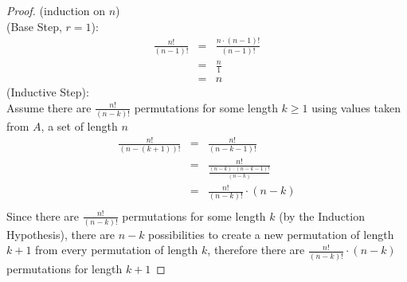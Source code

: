 \documentclass{article}
\begin{document}
\begin{enumerate}
    \begin{proof}
        (induction on $n$) \\
        (Base Step, $r=1$):
        \begin{eqnarray}
            \frac{n!}{(n-1)!} &=& \frac{n \cdot (n-1)!}{(n-1)!} \\
            &=& \frac{n}{1} \\
            &=& n
        \end{eqnarray}
        (Inductive Step): \\
        Assume there are $\frac{n!}{(n-k)!}$ permutations for some length $k \geq 1$ using values taken from $A$, a set of length $n$
        \begin{eqnarray}
            \frac{n!}{(n-(k+1))!} &=& \frac{n!}{(n-k-1)!} \\
            &=& \frac{n!}{\frac{(n-k) \cdot (n-k-1)!}{(n-k)}} \\
            &=& \frac{n!}{(n-k)!} \cdot (n-k) \\
        \end{eqnarray}
        Since there are $\frac{n!}{(n-k)!}$ permutations for some length $k$ (by the Induction Hypothesis), there are $n-k$ possibilities to create a new permutation of length $k+1$ from every permutation of length $k$, therefore there are $\frac{n!}{(n-k)!} \cdot (n-k)$ permutations for length $k+1$
    \end{proof}
\end{enumerate}
\end{document}
